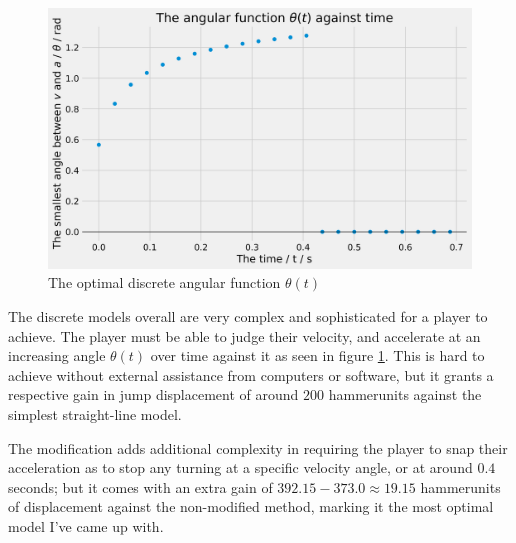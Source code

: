 \begin{figure}[H]
    \centering
    \includegraphics[width=0.8\linewidth]{assets/step_by_step_acc.png}
        \caption{The optimal discrete angular function $\theta(t)$}
        \label{fig:sbsa}
\end{figure}


The discrete models overall are very complex and sophisticated for a player to achieve. The player must be able to judge their velocity, and accelerate at an increasing angle $\theta(t)$ over time against it as seen in figure \ref{fig:sbsa}. This is hard to achieve without external assistance from computers or software, but it grants a respective gain in jump displacement of around $200$ hammerunits against the simplest straight-line model.

The modification adds additional complexity in requiring the player to snap their acceleration as to stop any turning at a specific velocity angle, or at around $0.4$ seconds; but it comes with an extra gain of $392.15-373.0\approx19.15$ hammerunits of displacement against the non-modified method, marking it the most optimal model I've came up with.


